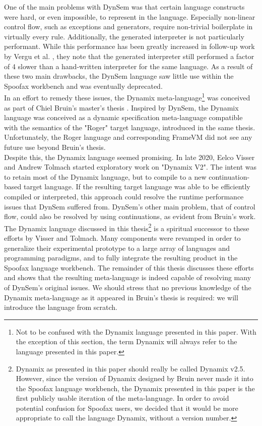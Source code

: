 One of the main problems with DynSem was that certain language constructs were hard, or even impossible, to represent in the language. Especially non-linear control flow, such as exceptions and generators, require non-trivial boilerplate in virtually every rule. Additionally, the generated interpreter is not particularly performant. While this performance has been greatly increased in follow-up work by Vergu et al. \cite{VerguV18}, they note that the generated interpreter still performed a factor of 4 slower than a hand-written interpreter for the same language. As a result of these two main drawbacks, the DynSem language saw little use within the Spoofax workbench and was eventually deprecated.\\

In an effort to remedy these issues, the Dynamix meta-language\footnote{Not to be confused with the Dynamix language presented in this paper. With the exception of this section, the term Dynamix will always refer to the language presented in this paper.} was conceived as part of Chiel Bruin's master's thesis \cite{Bruin2020}. Inspired by DynSem, the Dynamix language was conceived as a dynamic specification meta-language compatible with the semantics of the "Roger" target language, introduced in the same thesis. Unfortunately, the Roger language and corresponding FrameVM did not see any future use beyond Bruin's thesis.\\

Despite this, the Dynamix language seemed promising. In late 2020, Eelco Visser and Andrew Tolmach started exploratory work on "Dynamix V2". The intent was to retain most of the Dynamix language, but to compile to a new continuation-based target language. If the resulting target language was able to be efficiently compiled or interpreted, this approach could resolve the runtime performance issues that DynSem suffered from. DynSem's other main problem, that of control flow, could also be resolved by using continuations, as evident from Bruin's work.\\

The Dynamix language discussed in this thesis\footnote{Dynamix as presented in this paper should really be called Dynamix v2.5. However, since the version of Dynamix designed by Bruin never made it into the Spoofax language workbench, the Dynamix presented in this paper is the first publicly usable iteration of the meta-language. In order to avoid potential confusion for Spoofax users, we decided that it would be more appropriate to call the language Dynamix, without a version number.} is a spiritual successor to these efforts by Visser and Tolmach. Many components were revamped in order to generalize their experimental prototype to a large array of languages and programming paradigms, and to fully integrate the resulting product in the Spoofax language workbench. The remainder of this thesis discusses these efforts and shows that the resulting meta-language is indeed capable of resolving many of DynSem's original issues. We should stress that no previous knowledge of the Dynamix meta-language as it appeared in Bruin's thesis is required: we will introduce the language from scratch.